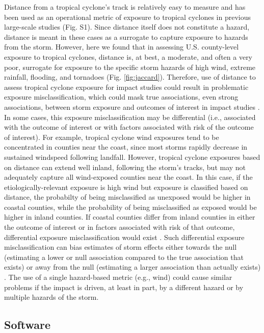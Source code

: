 \documentclass[fleqn,10pt,lineno]{olplainarticle}
\begin{document}
Distance from a tropical cyclone's track is relatively easy to measure and has
been used as an operational metric of exposure to tropical cyclones in previous
large-scale studies (Fig. S1). Since distance itself does not constitute a
hazard, distance is meant in these cases as a surrogate to capture exposure to
hazards from the storm. However, here we found that in assessing U.S.
county-level exposure to tropical cyclones, distance is, at best, a moderate,
and often a very poor, surrogate for exposure to the specific storm hazards of
high wind, extreme rainfall, flooding, and tornadoes (Fig. \ref{fig:jaccard}).
Therefore, use of distance to assess tropical cyclone exposure for impact
studies could result in problematic exposure misclassification, which could mask
true associations, even strong associations, between storm exposure and outcomes
of interest in impact studies \citep{savitz2016interpreting,
armstrong1998effect}. In some cases, this exposure misclassification may be
differential (i.e., associated with the outcome of interest or with factors
associated with risk of the outcome of interest). For example, tropical cyclone
wind exposures tend to be concentrated in counties near the coast, since most
storms rapidly decrease in sustained windspeed following landfall. However,
tropical cyclone exposures based on distance can extend well inland, following
the storm's tracks, but may not adequately capture all wind-exposed counties
near the coast. In this case, if the etiologically-relevant exposure is high
wind but exposure is classified based on distance, the probabilty of being
misclassified as unexposed would be higher in coastal counties, while the
probability of being misclassified as exposed would be higher in inland
counties. If coastal counties differ from inland counties in either the outcome
of interest or in factors associated with risk of that outcome, differential
exposure misclassification would exist \citep{savitz2016interpreting}. Such
differential exposure misclassification can bias estimates of storm effects
either towards the null (estimating a lower or null association compared to the
true association that exists) or away from the null (estimating a larger
association than actually exists) \citep{savitz2016interpreting,
armstrong1998effect}. The use of a single hazard-based metric (e.g., wind) could
cause similar problems if the impact is driven, at least in part, by a different
hazard or by multiple hazards of the storm.

\subsection*{Software}
\end{document}
